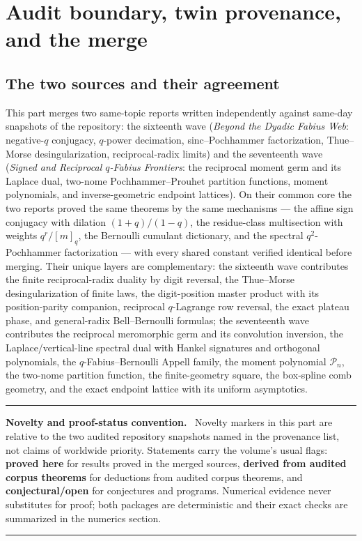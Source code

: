 \documentclass[11pt,oneside]{article}
\numberwithin{equation}{section}
\theoremstyle{definition}
\theoremstyle{remark}
\newcommand{\statusproved}{\textcolor{deepgreen}{\textbf{proved here}}}
\newcommand{\statusderived}{\textcolor{linkblue}{\textbf{derived from audited corpus theorems}}}
\newcommand{\statusopen}{\textcolor{deepred}{\textbf{conjectural/open}}}
\newenvironment{statusbox}[1]{%
  \par\medskip\noindent\begin{center}\begin{minipage}{0.94\textwidth}%
  \color{linkblue}\hrule\vspace{0.65em}%
  \color{black}\textbf{\color{linkblue}#1.}\ }{%
  \par\vspace{0.65em}\color{linkblue}\hrule
  \end{minipage}\end{center}\medskip}
\begin{document}
\section{Audit boundary, twin provenance, and the merge}

\subsection{The two sources and their agreement}

This part merges two same-topic reports written independently against
same-day snapshots of the repository: the sixteenth wave
(\emph{Beyond the Dyadic Fabius Web}: negative-$q$ conjugacy, $q$-power
decimation, sinc--Pochhammer factorization, Thue--Morse desingularization,
reciprocal-radix limits) and the seventeenth wave (\emph{Signed and Reciprocal
$q$-Fabius Frontiers}: the reciprocal moment germ and its Laplace dual,
two-nome Pochhammer--Prouhet partition functions, moment polynomials, and
inverse-geometric endpoint lattices).  On their common core the two reports
proved the same theorems by the same mechanisms --- the affine sign conjugacy
with dilation $(1+q)/(1-q)$, the residue-class multisection with weights
$q^r/[m]_q$, the Bernoulli cumulant dictionary, and the spectral
$q^2$-Pochhammer factorization --- with every shared constant verified
identical before merging.  Their unique layers are complementary: the
sixteenth wave contributes the finite reciprocal-radix duality by digit
reversal, the Thue--Morse desingularization of finite laws, the digit-position
master product with its position-parity companion, reciprocal $q$-Lagrange row
reversal, the exact plateau phase, and general-radix Bell--Bernoulli formulas;
the seventeenth wave contributes the reciprocal meromorphic germ and its
convolution inversion, the Laplace/vertical-line spectral dual with Hankel
signatures and orthogonal polynomials, the $q$-Fabius--Bernoulli Appell
family, the moment polynomial $\mathcal P_n$, the two-nome partition function,
the finite-geometry square, the box-spline comb geometry, and the exact
endpoint lattice with its uniform asymptotics.

\begin{statusbox}{Novelty and proof-status convention}
Novelty markers in this part are relative to the two audited repository
snapshots named in the provenance list, not claims of worldwide priority.
Statements carry the volume's usual flags: \statusproved{} for results proved
in the merged sources, \statusderived{} for deductions from audited corpus
theorems, and \statusopen{} for conjectures and programs.  Numerical evidence
never substitutes for proof; both packages are deterministic and their exact
checks are summarized in the numerics section.
\end{statusbox}
\end{document}
